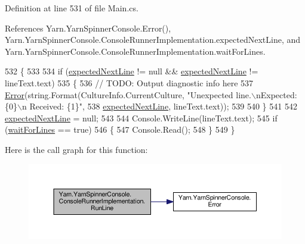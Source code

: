 Definition at line 531 of file Main.\-cs.



References Yarn.\-Yarn\-Spinner\-Console.\-Error(), Yarn.\-Yarn\-Spinner\-Console.\-Console\-Runner\-Implementation.\-expected\-Next\-Line, and Yarn.\-Yarn\-Spinner\-Console.\-Console\-Runner\-Implementation.\-wait\-For\-Lines.


\begin{DoxyCode}
532             \{
533 
534                 \textcolor{keywordflow}{if} (\hyperlink{a00053_a33a44e39f2d90850cee234dfad50f2c5}{expectedNextLine} != null && \hyperlink{a00053_a33a44e39f2d90850cee234dfad50f2c5}{expectedNextLine} != 
      lineText.text)
535                 \{
536                     \textcolor{comment}{// TODO: Output diagnostic info here}
537                     \hyperlink{a00172_a2f63f9f5b7634cb50ee75ff2eb18b137}{Error}(\textcolor{keywordtype}{string}.Format(CultureInfo.CurrentCulture, \textcolor{stringliteral}{"Unexpected line.\(\backslash\)nExpected: \{0\}\(\backslash\)n
      Received: \{1\}"},
538                         \hyperlink{a00053_a33a44e39f2d90850cee234dfad50f2c5}{expectedNextLine}, lineText.text));
539 
540                 \}
541 
542                 \hyperlink{a00053_a33a44e39f2d90850cee234dfad50f2c5}{expectedNextLine} = null;
543 
544                 Console.WriteLine(lineText.text);
545                 \textcolor{keywordflow}{if} (\hyperlink{a00053_a90b0c755ea1d2f3ffaffa6cf18266709}{waitForLines} == \textcolor{keyword}{true})
546                 \{
547                     Console.Read();
548                 \}
549             \}
\end{DoxyCode}


Here is the call graph for this function\-:
\nopagebreak
\begin{figure}[H]
\begin{center}
\leavevmode
\includegraphics[width=350pt]{a00053_a13bc6c3a8ba43223a20befae50dbbcb4_cgraph}
\end{center}
\end{figure}


